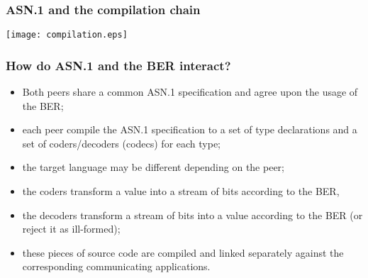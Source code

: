 \documentclass[compress,dvips,xcolor={dvipsnames},t]{beamer}
\newcommand\ASN{\textsf{ASN.1}\xspace}
\begin{document}
\begin{frame}
\frametitle{\ASN and the compilation chain}

\begin{center}
\texttt{[image: compilation.eps]}
\end{center}

\end{frame}

\begin{frame}
\frametitle{How do \ASN and the BER interact?}

\begin{itemize}

  \item Both peers share a common \ASN specification and agree upon
    the usage of the BER;

  \item each peer compile the \ASN specification to a set of type
    declarations and a set of coders/decoders (codecs) for each type;

  \item the target language may be different depending on the peer;

  \item the coders transform a value into a stream of bits according
    to the BER,

  \item the decoders transform a stream of bits into a value according
    to the BER (or reject it as ill-formed);

  \item these pieces of source code are compiled and linked separately
    against the corresponding communicating applications.

\end{itemize}

\end{frame}
\end{document}
